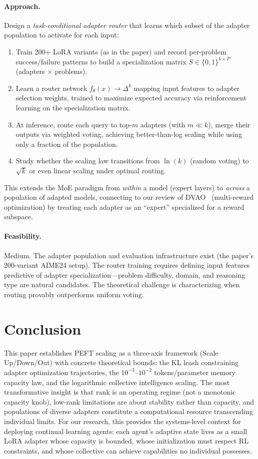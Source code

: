 \documentclass[11pt,a4paper]{article}
\begin{document}
\paragraph{Approach.} Design a \emph{task-conditional adapter router} that learns which subset of the adapter population to activate for each input:
\begin{enumerate}
\item Train 200+ LoRA variants (as in the paper) and record per-problem success/failure patterns to build a specialization matrix $S \in \{0,1\}^{k \times P}$ (adapters $\times$ problems).
\item Learn a router network $f_\theta(x) \to \Delta^k$ mapping input features to adapter selection weights, trained to maximize expected accuracy via reinforcement learning on the specialization matrix.
\item At inference, route each query to top-$m$ adapters (with $m \ll k$), merge their outputs via weighted voting, achieving better-than-log scaling while using only a fraction of the population.
\item Study whether the scaling law transitions from $\ln(k)$ (random voting) to $\sqrt{k}$ or even linear scaling under optimal routing.
\end{enumerate}
This extends the MoE paradigm from \emph{within} a model (expert layers) to \emph{across} a population of adapted models, connecting to our review of DVAO~\cite{dvao2026} (multi-reward optimization) by treating each adapter as an ``expert'' specialized for a reward subspace.

\paragraph{Feasibility.} Medium. The adapter population and evaluation infrastructure exist (the paper's 200-variant AIME24 setup). The router training requires defining input features predictive of adapter specialization---problem difficulty, domain, and reasoning type are natural candidates. The theoretical challenge is characterizing when routing provably outperforms uniform voting.

\section{Conclusion}

This paper establishes PEFT scaling as a three-axis framework (Scale Up/Down/Out) with concrete theoretical bounds: the KL leash constraining adapter optimization trajectories, the $10^{-3}$--$10^{-2}$ tokens/parameter memory capacity law, and the logarithmic collective intelligence scaling. The most transformative insight is that rank is an operating regime (not a monotonic capacity knob), low-rank limitations are about stability rather than capacity, and populations of diverse adapters constitute a computational resource transcending individual limits. For our research, this provides the systems-level context for deploying continual learning agents: each agent's adaptive state lives as a small LoRA adapter whose capacity is bounded, whose initialization must respect RL constraints, and whose collective can achieve capabilities no individual possesses.
\end{document}
